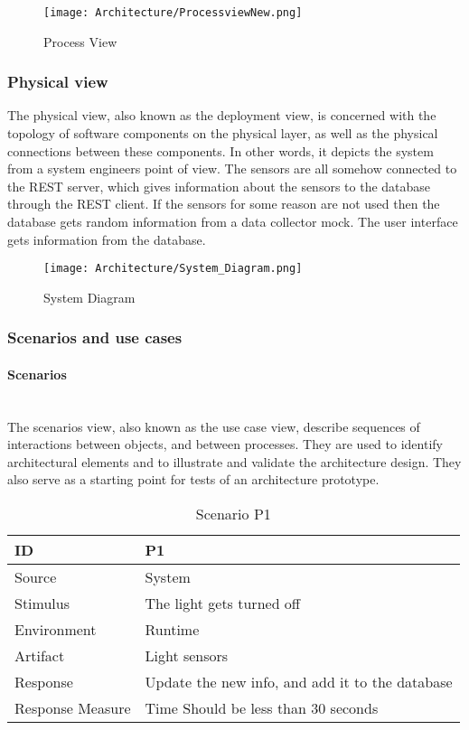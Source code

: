 \documentclass[../document.tex]{subfiles}
\begin{document}
\begin{figure}[H]
	\centering
	\texttt{[image: Architecture/ProcessviewNew.png]}
	\caption{Process View}
\end{figure}

\subsubsection{Physical view}
The physical view, also known as the deployment view, is concerned with the topology of software components on the physical layer, as well as the physical connections between these components. In other words, it depicts the system from a system engineers point of view. The sensors are all somehow connected to the REST server, which gives information about the sensors to the database through the REST client. If the sensors for some reason are not used then the database gets random information from a data collector mock. The user interface gets information from the database.

\begin{figure}[H]
	\centering
	\texttt{[image: Architecture/System\_Diagram.png]}
	\caption{System Diagram}
\end{figure}

\subsubsection{Scenarios and use cases}
\paragraph{Scenarios} \ \\
The scenarios view, also known as the use case view, describe sequences of interactions between objects, and between processes. They are used to identify architectural elements and to illustrate and validate the architecture design. They also serve as a starting point for tests of an architecture prototype.

\begin{table}[H]
	\caption{Scenario P1}
	\begin{tabularx}{\textwidth}{|X|X|}
		\hline
		ID					& P1 \\ \hline
		Source				& System \\ \hline
		Stimulus			& The light gets turned off \\ \hline
		Environment			& Runtime \\ \hline
		Artifact			& Light sensors \\ \hline
		Response			& Update the new info, and add it to the database \\ \hline
		Response Measure	& Time \newline Should be less than 30 seconds
		\\ \hline
	\end{tabularx}
\end{table}
\end{document}
